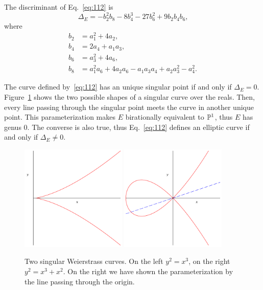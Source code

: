The discriminant of
Eq.~\eqref{eq:112} is
\begin{equation}
  \label{eq:118}
  \Delta_E = -b_2^2b_8-8b_4^3-27b_6^2+9b_2b_4b_6
  \text{,}
\end{equation}
where
\begin{equation}
  \label{eq:117}
  \begin{aligned}
    b_2 &= a_1^2 + 4a_2\text{,}\\
    b_4 &= 2a_4 + a_1a_3\text{,}\\
    b_6 &= a_3^2 + 4a_6\text{,}\\
    b_8 &= a_1^2a_6+4a_2a_6-a_1a_3a_4+a_2a_3^2-a_4^2\text{.}
  \end{aligned}
\end{equation}

\begin{remark}
  The curve defined by~\eqref{eq:112} has an unique singular point if
  and only if $\Delta_E=0$.  Figure~\ref{fig:singular} shows the two
  possible shapes of a singular curve over the reals. Then, every line
  passing through the singular point meets the curve in another unique
  point. This parameterization makes $E$ birationally equivalent to
  $\mathbb{P}^1$, thus $E$ has genus $0$. The converse is also true, thus
  Eq.~\eqref{eq:112} defines an elliptic curve if and only if
  $\Delta_E\ne0$.
\end{remark}


\begin{figure}[ht]
  \centering
  \includegraphics[width=0.45\textwidth]{isogeny/cusp}
  \includegraphics[width=0.45\textwidth]{isogeny/node}
  \caption{Two singular Weierstrass curves. On the left $y^2=x^3$, on
    the right $y^2=x^3+x^2$. On the right we have shown the
    parameterization by the line passing through the origin.}
  \label{fig:singular}
\end{figure}

